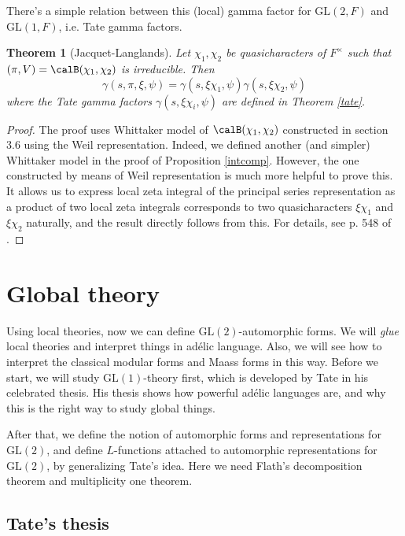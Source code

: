 \documentclass{article}
\newtheorem{theorem}{Theorem}[section]
\newcommand{\GL}{\mathrm{GL}}
\begin{document}
There's a simple relation between this (local) gamma factor for  $\GL(2, F)$ and $\GL(1, F)$, i.e. Tate gamma factors.
\begin{theorem}[Jacquet-Langlands]
Let $\chi_1, \chi_2$ be quasicharacters of $F^{\times}$ such that $(\pi, V) = \calB(\chi_1, \chi_2)$ is irreducible. Then 
$$
\gamma(s, \pi, \xi, \psi) = \gamma(s, \xi\chi_1, \psi)\gamma(s, \xi\chi_2, \psi)
$$
where the Tate gamma factors $\gamma(s, \xi\chi_i, \psi)$ are defined in Theorem \ref{tate}. 
\end{theorem}
\begin{proof}
The proof uses Whittaker model of $\calB(\chi_1, \chi_2)$ constructed in section 3.6 using the Weil representation. 
Indeed, we defined another (and simpler) Whittaker model in the proof of Proposition \ref{intcomp}. 
However, the one constructed by means of Weil representation is much more helpful to prove this. 
It allows us to express local zeta integral of the principal series representation as a product of two local zeta integrals corresponds to two quasicharacters $\xi\chi_1$ and $\xi\chi_2$ naturally, and the result directly follows from this. For details, see p. 548 of \cite{bu}.
\end{proof}



\newpage

\section{Global theory}

Using local theories, now we can define $\GL(2)$-automorphic forms. We will \emph{glue} local theories and interpret things in ad\'elic language. Also, we will see how to interpret the classical modular forms and Maass forms in this way. Before we start, we will study $\GL(1)$-theory first, which is developed by Tate in his celebrated thesis. His thesis shows how powerful ad\'elic languages are, and why this is the right way to study global things. 

After that, we define the notion of automorphic forms and representations for $\GL(2)$, and define $L$-functions attached to automorphic representations for $\GL(2)$, by generalizing Tate's idea. 
Here we need Flath's decomposition theorem and multiplicity one theorem. 

\subsection{Tate's thesis}
\end{document}
